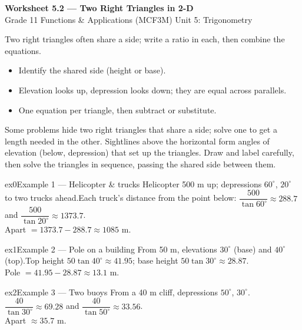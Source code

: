 \documentclass[11pt]{article}
\begin{document}
\begin{center}
{\LARGE\bfseries\color{titleblue}Worksheet 5.2 --- Two Right Triangles in 2-D}\\[2pt]
{\small Grade 11 Functions \& Applications (MCF3M) \textperiodcentered{} Unit 5: Trigonometry}
\end{center}

\begin{ideabox}
Two right triangles often share a side; write a ratio in each, then combine the equations.
\begin{itemize}[leftmargin=*,itemsep=2pt]
  \item Identify the shared side (height or base).
  \item Elevation looks up, depression looks down; they are equal across parallels.
  \item One equation per triangle, then subtract or substitute.
\end{itemize}
\end{ideabox}

\begin{learnbox}
Some problems hide two right triangles that share a side; solve one to get a length needed in the other.
Sightlines above the horizontal form angles of elevation (below, depression) that set up the triangles.
Draw and label carefully, then solve the triangles in sequence, passing the shared side between them.
\end{learnbox}


\begin{example}{ex0}{Example 1 --- Helicopter \& trucks}
Helicopter 500 m up; depressions $60^\circ$, $20^\circ$ to two trucks ahead.\soln Each truck's distance from the point below: $\dfrac{500}{\tan60^\circ}\approx288.7$ and $\dfrac{500}{\tan20^\circ}\approx1373.7$. \\ Apart $=1373.7-288.7\approx1085$ m.
\end{example}

\begin{example}{ex1}{Example 2 --- Pole on a building}
From 50 m, elevations $30^\circ$ (base) and $40^\circ$ (top).\soln Top height $50\tan40^\circ\approx41.95$; base height $50\tan30^\circ\approx28.87$. \\ Pole $=41.95-28.87\approx13.1$ m.
\end{example}

\begin{example}{ex2}{Example 3 --- Two buoys}
From a 40 m cliff, depressions $50^\circ$, $30^\circ$.\soln $\dfrac{40}{\tan30^\circ}\approx69.28$ and $\dfrac{40}{\tan50^\circ}\approx33.56$. \\ Apart $\approx35.7$ m.
\end{example}
\end{document}
